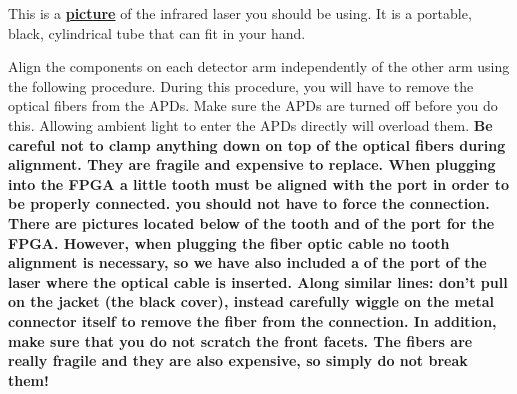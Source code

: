 \documentclass{../lab}
\begin{document}
This is a \href{http://experimentationlab.berkeley.edu/sites/default/files/QIE/laser.JPG}{\textbf{picture}} of the infrared laser you should be using. It is a portable, black, cylindrical tube that can fit in your hand.

Align the components on each detector arm independently of the other arm using the following procedure. During this procedure, you will have to remove the optical fibers from the APDs. Make sure the APDs are turned off before you do this. Allowing ambient light to enter the APDs directly will overload them. \textbf{Be careful not to clamp anything down on top of the optical fibers during alignment. They are fragile and expensive to replace. When plugging into the FPGA a little tooth must be aligned with the port in order to be properly connected. you should not have to force the connection. There are pictures located below }\textbf{of the tooth and }\textbf{of the port for the FPGA. However, when plugging the fiber optic cable no tooth alignment is necessary, so we have also included a }\textbf{of the port of the laser where the optical cable is inserted. Along similar lines: don't pull on the jacket (the black cover), instead carefully wiggle on the metal connector itself to remove the fiber from the connection. In addition, make sure that you do not scratch the front facets. The fibers are really fragile and they are also expensive, so simply do not break them!}


\noindent
\end{document}
